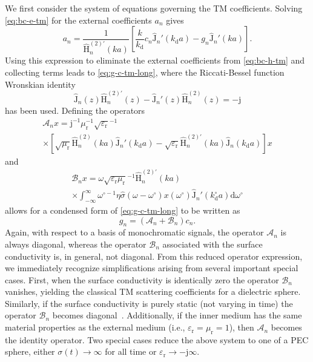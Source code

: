 \documentclass[article]{IEEEtran}
\newcommand{\T}[1]{\mathrm{#1}}
\newcommand{\Jh}{\hat{\T{J}}}
\newcommand{\Hh}{\hat{\T{H}}^{(2)}}
\newcommand{\Hhp}{\hat{\T{H}}^{(2)\prime}}
\begin{document}
We first consider the system of equations governing the TM coefficients.  Solving \eqref{eq:bc-e-tm} for the external coefficients $a_n$ gives
\begin{equation}
     a_n = \frac{1}{\Hhp_n(ka)}\left[\frac{k}{k_\T{d}}c_n\Jh_n'(k_\T{d}a) - g_n\Jh_n'(ka)\right].
    \label{eq:an-cn}
\end{equation}
Using this expression to eliminate the external coefficients from \eqref{eq:bc-h-tm} and collecting terms leads to \eqref{eq:g-c-tm-long}, where the Riccati-Bessel function Wronskian identity~\cite{abramowitz1948handbook}
\begin{equation}
    \Jh_n(z)\Hhp_n(z) - \Jh_n'(z)\Hh_n(z) = -\T{j}
    \label{eq:h2-wronsk}
\end{equation}
has been used.  Defining the operators
\begin{multline}
    \mathcal{A}_n x = \T{j}^{-1}\mu_\T{r}^{-1}\sqrt{\varepsilon_\T{r}}^{-1}\\\times\left[\sqrt{\mu_\T{r}}\Hh_n(ka)\Jh_n'(k_\T{d}a) -\sqrt{\varepsilon_\T{r}}\Hhp_n(ka)\Jh_n(k_\T{d}a)\right]x
\end{multline}
and
\begin{multline}
    \mathcal{B}_n x = \omega\sqrt{\varepsilon_\T{r}\mu_\T{r}}^{-1}\Hhp_n(ka)\\\times\int_{-\infty}^\infty \omega^{\circ-1}\eta\hat{\sigma}(\omega-\omega^\circ)x(\omega^\circ)\Jh_n'(k^\circ_\T{d}a) \T{d}\omega^\circ
\end{multline}
allows for a condensed form of \eqref{eq:g-c-tm-long} to be written as
\begin{equation}
    g_n = \left(\mathcal{A}_n+\mathcal{B}_n\right)c_n.
    \label{eq:gn-tm-cont}
\end{equation}
Again, with respect to a basis of monochromatic signals, the operator $\mathcal{A}_n$ is always diagonal, whereas the operator $\mathcal{B}_n$ associated with the surface conductivity is, in general, not diagonal.  From this reduced operator expression, we immediately recognize simplifications arising from several important special cases.  First, when the surface conductivity is identically zero the operator $\mathcal{B}_n$ vanishes, yielding the classical TM scattering coefficients for a dielectric sphere.  Similarly, if the surface conductivity is purely static (not varying in time) the operator $\mathcal{B}_n$ becomes diagonal~\cite{wait1965calculations}. Additionally, if the inner medium has the same material properties as the external medium (i.e., $\varepsilon_\T{r} = \mu_\T{r} = 1$), then $\mathcal{A}_n$ becomes the identity operator.  Two special cases reduce the above system to one of a PEC sphere, either $\sigma(t)\rightarrow\infty$ for all time or  $\varepsilon_\T{r}\rightarrow -\T{j}\infty$.  
\end{document}
